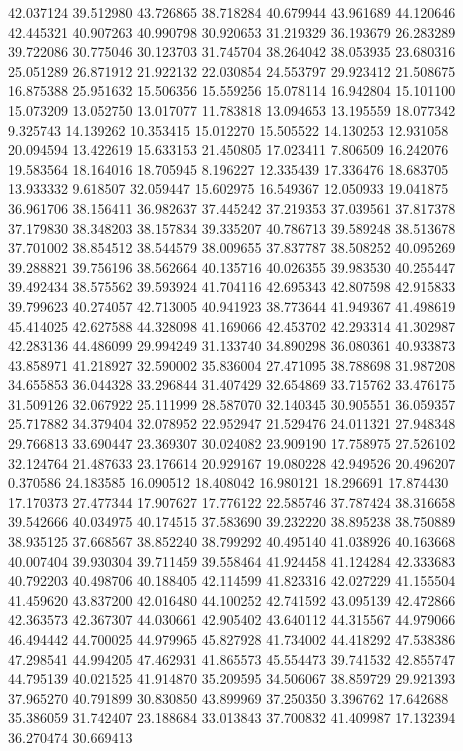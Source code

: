 42.037124
39.512980
43.726865
38.718284
40.679944
43.961689
44.120646
42.445321
40.907263
40.990798
30.920653
31.219329
36.193679
26.283289
39.722086
30.775046
30.123703
31.745704
38.264042
38.053935
23.680316
25.051289
26.871912
21.922132
22.030854
24.553797
29.923412
21.508675
16.875388
25.951632
15.506356
15.559256
15.078114
16.942804
15.101100
15.073209
13.052750
13.017077
11.783818
13.094653
13.195559
18.077342
9.325743
14.139262
10.353415
15.012270
15.505522
14.130253
12.931058
20.094594
13.422619
15.633153
21.450805
17.023411
7.806509
16.242076
19.583564
18.164016
18.705945
8.196227
12.335439
17.336476
18.683705
13.933332
9.618507
32.059447
15.602975
16.549367
12.050933
19.041875
36.961706
38.156411
36.982637
37.445242
37.219353
37.039561
37.817378
37.179830
38.348203
38.157834
39.335207
40.786713
39.589248
38.513678
37.701002
38.854512
38.544579
38.009655
37.837787
38.508252
40.095269
39.288821
39.756196
38.562664
40.135716
40.026355
39.983530
40.255447
39.492434
38.575562
39.593924
41.704116
42.695343
42.807598
42.915833
39.799623
40.274057
42.713005
40.941923
38.773644
41.949367
41.498619
45.414025
42.627588
44.328098
41.169066
42.453702
42.293314
41.302987
42.283136
44.486099
29.994249
31.133740
34.890298
36.080361
40.933873
43.858971
41.218927
32.590002
35.836004
27.471095
38.788698
31.987208
34.655853
36.044328
33.296844
31.407429
32.654869
33.715762
33.476175
31.509126
32.067922
25.111999
28.587070
32.140345
30.905551
36.059357
25.717882
34.379404
32.078952
22.952947
21.529476
24.011321
27.948348
29.766813
33.690447
23.369307
30.024082
23.909190
17.758975
27.526102
32.124764
21.487633
23.176614
20.929167
19.080228
42.949526
20.496207
0.370586
24.183585
16.090512
18.408042
16.980121
18.296691
17.874430
17.170373
27.477344
17.907627
17.776122
22.585746
37.787424
38.316658
39.542666
40.034975
40.174515
37.583690
39.232220
38.895238
38.750889
38.935125
37.668567
38.852240
38.799292
40.495140
41.038926
40.163668
40.007404
39.930304
39.711459
39.558464
41.924458
41.124284
42.333683
40.792203
40.498706
40.188405
42.114599
41.823316
42.027229
41.155504
41.459620
43.837200
42.016480
44.100252
42.741592
43.095139
42.472866
42.363573
42.367307
44.030661
42.905402
43.640112
44.315567
44.979066
46.494442
44.700025
44.979965
45.827928
41.734002
44.418292
47.538386
47.298541
44.994205
47.462931
41.865573
45.554473
39.741532
42.855747
44.795139
40.021525
41.914870
35.209595
34.506067
38.859729
29.921393
37.965270
40.791899
30.830850
43.899969
37.250350
3.396762
17.642688
35.386059
31.742407
23.188684
33.013843
37.700832
41.409987
17.132394
36.270474
30.669413
